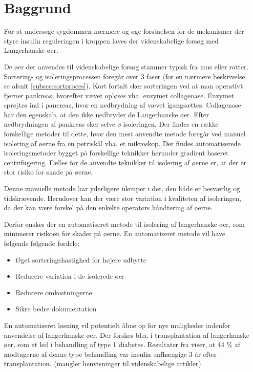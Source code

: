 \section{Baggrund}
For at undersøge sygdommen nærmere og øge forståelsen for de mekanismer der styre insulin reguleringen i kroppen laves der videnskabelige forsøg med Langerhanske øer.

De øer der anvendes til videnskabelige forsøg stammer typisk fra mus eller rotter. Sortering- og isoleringsprocessen foregår over 3 faser (for en nærmere beskrivelse se afsnit \ref{subsec:sortproces}). Kort fortalt sker sorteringen ved at man operativt fjerner pankreas, hvorefter vævet opløses vha. enzymet collagenase. Enzymet sprøjtes ind i pancreas, hvor en nedbrydning af vævet igangsættes. Collagenase har den egenskab, at den ikke nedbryder de Langerhanske øer. Efter nedbrydningen af pankreas sker selve ø isoleringen. Der findes en række forskellige metoder til dette, hvor den mest anvendte metode foregår ved manuel isolering af øerne fra en petriskål vha. et mikroskop. Der findes automatiserede isoleringsmetoder bygget på forskellige teknikker herunder gradient baseret centrifugering. Fælles for de anvendte teknikker til  isolering af øerne er, at der er stor risiko for skade på øerne.

Denne manuelle metode har yderligere ulemper i det, den både er besværlig og tidskrævende. Herudover kan der være stor variation i kvaliteten af isoleringen, da der kan være forskel på den enkelte operatørs håndtering af øerne. 

Derfor ønskes der en automatiseret metode til isolering af langerhanske øer, som minimerer risikoen for skader på øerne. En automatiseret metode vil have følgende følgende fordele: 

\begin{itemize}
\item Øget sorteringshastighed for højere udbytte
\item Reducere variation i de isolerede øer
\item Reducere omkostningerne
\item Sikre bedre dokumentation
\end{itemize} 

En automatiseret løsning vil potentielt åbne op for nye muligheder indenfor anvendelse af langerhanske øer. Der forskes bl.a. i transplantation af langerhanske øer, som et led i behandling af type 1 diabetes. Resultater fra  viser, at 44 \% af modtagerne af denne type behandling var insulin uafhængige 3 år efter transplantation.  (mangler henvisninger til videnskabelige artikler)

